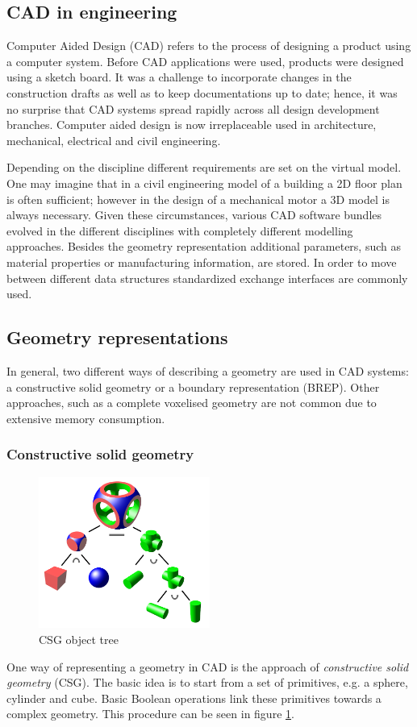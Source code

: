 \subsection{CAD in engineering}
Computer Aided Design (CAD) refers to the process of designing a product using a computer system. Before CAD applications were used, products were designed using a sketch board. It was a challenge to incorporate changes in the construction drafts as well as to keep documentations up to date; hence, it was no surprise that CAD systems spread rapidly across all design development branches. Computer aided design is now irreplaceable used in architecture, mechanical, electrical and civil engineering.

Depending on the discipline different requirements are set on the virtual model. One may imagine that in a civil engineering model of a building a 2D floor plan is often sufficient; however in the design of a mechanical motor a 3D model is always necessary. Given these circumstances, various CAD software bundles evolved in the different disciplines with completely different modelling approaches. Besides the geometry representation additional parameters, such as material properties or manufacturing information, are stored. In order to move between different data structures standardized exchange interfaces are commonly used.
\subsection{Geometry representations}
In general, two different ways of describing a geometry are used in CAD systems: a constructive solid geometry or a boundary representation (BREP). Other approaches, such as a complete voxelised geometry are not common due to extensive memory consumption.
\subsubsection{Constructive solid geometry}
\begin{figure}
\centering
\includegraphics[width=0.5\textwidth]{Pictures/Csg_tree.png}
\caption{CSG object tree}
\label{fig:csg_tree}
\end{figure}
One way of representing a geometry in CAD is the approach of \emph{constructive solid geometry} (CSG). The basic idea is to start from a set of primitives, e.g. a sphere, cylinder and cube. Basic Boolean operations link these primitives towards a complex geometry. This procedure can be seen in figure \ref{fig:csg_tree}.

